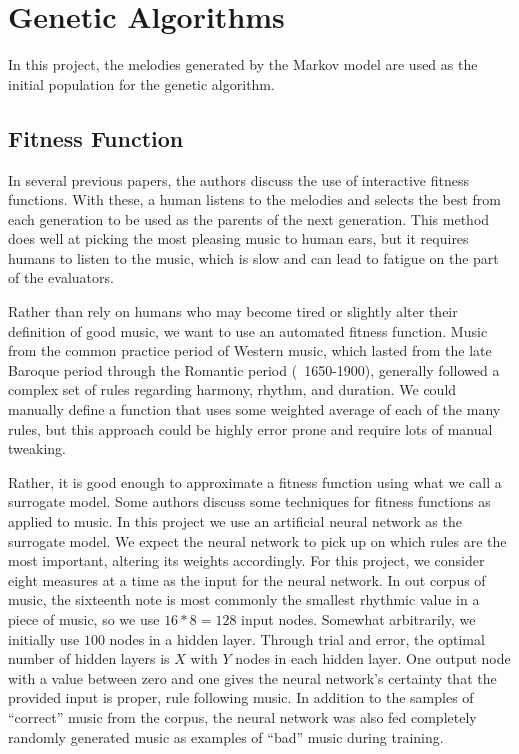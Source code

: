 \chapter{Genetic Algorithms} \label{ga}

In this project, the melodies generated by the Markov model are used as the initial population for the genetic algorithm.

\section{Fitness Function} \label{ga:fitness}

In several previous papers, the authors discuss the use of interactive fitness functions.
With these, a human listens to the melodies and selects the best from each generation to be used as the parents of the next generation.
This method does well at picking the most pleasing music to human ears, but it requires humans to listen to the music, which is slow and can lead to fatigue on the part of the evaluators.

Rather than rely on humans who may become tired or slightly alter their definition of good music, we want to use an automated fitness function.
Music from the common practice period of Western music, which lasted from the late Baroque period through the Romantic period (~1650-1900), generally followed a complex set of rules regarding harmony, rhythm, and duration.
We could manually define a function that uses some weighted average of each of the many rules, but this approach could be highly error prone and require lots of manual tweaking.

Rather, it is good enough to approximate a fitness function using what we call a surrogate model. %
Some authors discuss some techniques for fitness functions as applied to music.
In this project we use an artificial neural network as the surrogate model.
We expect the neural network to pick up on which rules are the most important, altering its weights accordingly.
For this project, we consider eight measures at a time as the input for the neural network.
In out corpus of music, the sixteenth note is most commonly the smallest rhythmic value in a piece of music, so we use $16 * 8 = 128$ input nodes.
Somewhat arbitrarily, we initially use $100$ nodes in a hidden layer.
Through trial and error, the optimal number of hidden layers is $X$ with $Y$ nodes in each hidden layer. %
One output node with a value between zero and one gives the neural network's certainty that the provided input is proper, rule following music.
In addition to the samples of ``correct'' music from the corpus, the neural network was also fed completely randomly generated music as examples of ``bad'' music during training.

